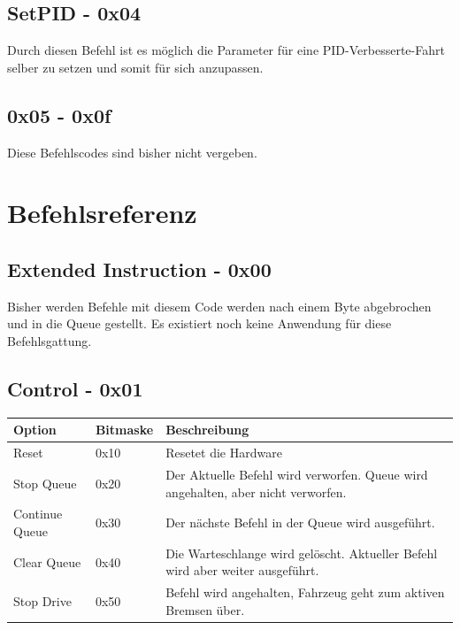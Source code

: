 \documentclass[a4paper]{article}
\begin{document}
	\subsection{SetPID - 0x04}

	Durch diesen Befehl ist es möglich die Parameter für eine PID-Verbesserte-Fahrt selber zu setzen und somit für sich
	anzupassen.

	\subsection{0x05 - 0x0f}

	Diese Befehlscodes sind bisher nicht vergeben.


	\section{Befehlsreferenz}

	\subsection{Extended Instruction - 0x00}

	Bisher werden Befehle mit diesem Code werden nach einem Byte abgebrochen und in die Queue gestellt. Es existiert noch
	keine Anwendung für diese Befehlsgattung.

	\subsection{Control - 0x01}

	\begin{tabularx}{\linewidth}{|l|l|X|}
		\hline
		\textbf{Option} & \textbf{Bitmaske} & \textbf{Beschreibung} \\
		\hline
		\hline
		Reset 			& 0x10 				& Resetet die Hardware \\
		\hline
		Stop Queue		& 0x20				& Der Aktuelle Befehl wird verworfen. Queue wird angehalten, aber nicht verworfen. \\
		\hline
		Continue Queue	& 0x30				& Der nächste Befehl in der Queue wird ausgeführt. \\
		\hline
		Clear Queue		& 0x40				& Die Warteschlange wird gelöscht. Aktueller Befehl wird aber weiter ausgeführt. \\
		\hline
		Stop Drive		& 0x50				& Befehl wird angehalten, Fahrzeug geht zum aktiven Bremsen über. \\
		\hline
	\end{tabularx}
\end{document}
